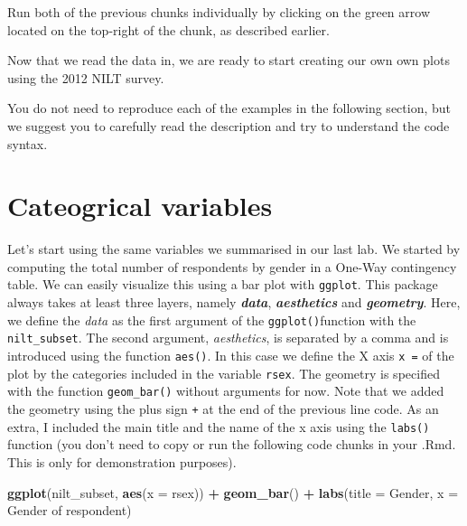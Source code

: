 \documentclass[
]{book}
\newenvironment{Shaded}{\begin{snugshade}}{\end{snugshade}}
\newcommand{\AttributeTok}[1]{\textcolor[rgb]{0.13,0.29,0.53}{#1}}
\newcommand{\FunctionTok}[1]{\textcolor[rgb]{0.13,0.29,0.53}{\textbf{#1}}}
\newcommand{\NormalTok}[1]{#1}
\newcommand{\SpecialCharTok}[1]{\textcolor[rgb]{0.81,0.36,0.00}{\textbf{#1}}}
\newcommand{\StringTok}[1]{\textcolor[rgb]{0.31,0.60,0.02}{#1}}
\begin{document}
Run both of the previous chunks individually by clicking on the green arrow located on the top-right of the chunk, as described earlier.

Now that we read the data in, we are ready to start creating our own own plots using the 2012 NILT survey.

You do not need to reproduce each of the examples in the following section, but we suggest you to carefully read the description and try to understand the code syntax.

\hypertarget{cateogrical-variables}{%
\section{Cateogrical variables}\label{cateogrical-variables}}

Let's start using the same variables we summarised in our last lab. We started by computing the total number of respondents by gender in a One-Way contingency table. We can easily visualize this using a bar plot with \texttt{ggplot}. This package always takes at least three layers, namely \emph{\textbf{data}}, \emph{\textbf{aesthetics}} and \emph{\textbf{geometry}}. Here, we define the \emph{data} as the first argument of the \texttt{ggplot()}function with the \texttt{nilt\_subset}. The second argument, \emph{aesthetics}, is separated by a comma and is introduced using the function \texttt{aes()}. In this case we define the X axis \texttt{x\ =} of the plot by the categories included in the variable \texttt{rsex}. The geometry is specified with the function \texttt{geom\_bar()} without arguments for now. Note that we added the geometry using the plus sign \texttt{+} at the end of the previous line code. As an extra, I included the main title and the name of the x axis using the \texttt{labs()} function (you don't need to copy or run the following code chunks in your .Rmd. This is only for demonstration purposes).

\begin{Shaded}
\begin{Highlighting}[]
\FunctionTok{ggplot}\NormalTok{(nilt\_subset, }\FunctionTok{aes}\NormalTok{(}\AttributeTok{x =}\NormalTok{ rsex)) }\SpecialCharTok{+}
  \FunctionTok{geom\_bar}\NormalTok{() }\SpecialCharTok{+}
  \FunctionTok{labs}\NormalTok{(}\AttributeTok{title =} \StringTok{\textquotesingle{}Gender\textquotesingle{}}\NormalTok{, }\AttributeTok{x =} \StringTok{\textquotesingle{}Gender of respondent\textquotesingle{}}\NormalTok{)}
\end{Highlighting}
\end{Shaded}
\end{document}
